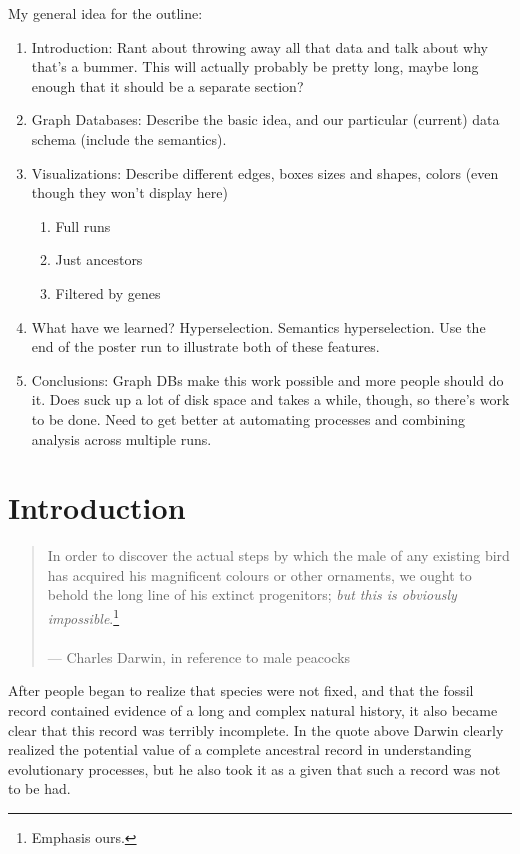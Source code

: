My general idea for the outline:
\begin{enumerate}
	\item Introduction: Rant about throwing away all that data and talk about why that's a bummer. This will actually probably be pretty long, maybe long enough that it should be a separate section?
	\item Graph Databases: Describe the basic idea, and our particular (current) data schema (include the semantics).
	\item Visualizations: Describe different edges, boxes sizes and shapes, colors (even though they won't display here)
	\begin{enumerate}
		\item Full runs
		\item Just ancestors
		\item Filtered by genes
	\end{enumerate}
	\item What have we learned? Hyperselection. Semantics hyperselection. Use the end of the poster run to illustrate both of these features.
	\item Conclusions: Graph DBs make this work possible and more people should do it. Does suck up a lot of disk space and takes a while, though, so there's work to be done. Need to get better at automating processes and combining analysis across multiple runs.
\end{enumerate}

\section{Introduction}
\label{sec:intro}

\begin{quote}
	In order to discover the actual steps by which the male of any existing 
	bird has acquired his magnificent colours or other ornaments, we ought 
	to behold the long line of his extinct progenitors; \emph{but this is obviously impossible}.\footnote{Emphasis ours.} \\
	\\
	--- Charles Darwin, in reference to male peacocks~\cite{Darwin} 
\end{quote}

After people began to realize that species were not fixed, and that the fossil 
record contained evidence of a long and complex natural history, it also
became clear that this record was terribly incomplete. In the quote above
Darwin clearly realized the potential value of a complete ancestral record in
understanding evolutionary processes, but he also took it as a given that
such a record was not to be had.

